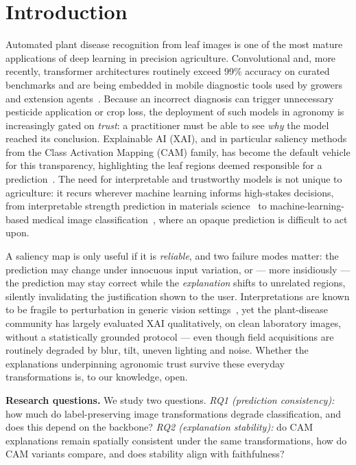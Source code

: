 \documentclass[runningheads]{llncs}
\begin{document}
\section{Introduction}
Automated plant disease recognition from leaf images is one of the most mature
applications of deep learning in precision agriculture. Convolutional and, more
recently, transformer architectures routinely exceed 99\% accuracy on curated
benchmarks and are being embedded in mobile diagnostic tools used by growers and
extension agents~\cite{mohanty2016plantvillage,ferentinos2018,too2019}. Because
an incorrect diagnosis can trigger unnecessary pesticide application or crop
loss, the deployment of such models in agronomy is increasingly gated on
\emph{trust}: a practitioner must be able to see \emph{why} the model reached its
conclusion. Explainable AI (XAI), and in particular saliency methods from the
Class Activation Mapping (CAM) family, has become the default vehicle for this
transparency, highlighting the leaf regions deemed responsible for a
prediction~\cite{zhou2016cam,selvaraju2020gradcam,arrieta2020xai}. The need for
interpretable and trustworthy models is not unique to agriculture: it recurs
wherever machine learning informs high-stakes decisions, from interpretable
strength prediction in materials science~\cite{nageshwaran2026interpretable} to
machine-learning-based medical image classification~\cite{nageshwaran2024braintumor},
where an opaque prediction is difficult to act upon.

A saliency map is only useful if it is \emph{reliable}, and two failure modes
matter: the prediction may change under innocuous input variation, or --- more
insidiously --- the prediction may stay correct while the \emph{explanation} shifts
to unrelated regions, silently invalidating the justification shown to the user.
Interpretations are known to be fragile to perturbation in generic vision
settings~\cite{ghorbani2019fragile,alvarez2018robustness,adebayo2018sanity}, yet
the plant-disease community has largely evaluated XAI qualitatively, on clean
laboratory images, without a statistically grounded protocol --- even though field
acquisitions are routinely degraded by blur, tilt, uneven lighting and noise.
Whether the explanations underpinning agronomic trust survive these everyday
transformations is, to our knowledge, open.

\smallskip
\noindent\textbf{Research questions.} We study two questions.
\emph{RQ1 (prediction consistency):} how much do label-preserving image
transformations degrade classification, and does this depend on the backbone?
\emph{RQ2 (explanation stability):} do CAM explanations remain spatially
consistent under the same transformations, how do CAM variants compare, and does
stability align with faithfulness?
\end{document}
